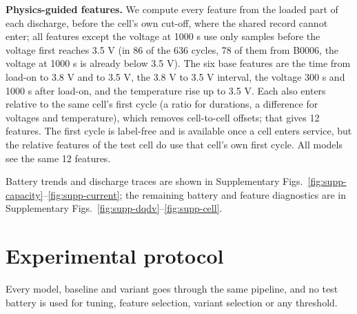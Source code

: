 \documentclass[conference,a4paper]{IEEEtran}
\begin{document}
\textbf{Physics-guided features.} We compute every feature from the loaded part of each discharge, before the cell's own cut-off, where the shared record cannot enter; all features except the voltage at 1000 s use only samples before the voltage first reaches 3.5 V (in 86 of the 636 cycles, 78 of them from B0006, the voltage at 1000 s is already below 3.5 V). The six base features are the time from load-on to 3.8 V and to 3.5 V, the 3.8 V to 3.5 V interval, the voltage 300 s and 1000 s after load-on, and the temperature rise up to 3.5 V. Each also enters relative to the same cell's first cycle (a ratio for durations, a difference for voltages and temperature), which removes cell-to-cell offsets; that gives 12 features. The first cycle is label-free and is available once a cell enters service, but the relative features of the test cell do use that cell's own first cycle. All models see the same 12 features.

Battery trends and discharge traces are shown in Supplementary Figs.~\ref{fig:supp-capacity}--\ref{fig:supp-current}; the remaining battery and feature diagnostics are in Supplementary Figs.~\ref{fig:supp-dqdv}--\ref{fig:supp-cell}.

\section{Experimental protocol}

Every model, baseline and variant goes through the same pipeline, and no test battery is used for tuning, feature selection, variant selection or any threshold.
\end{document}
